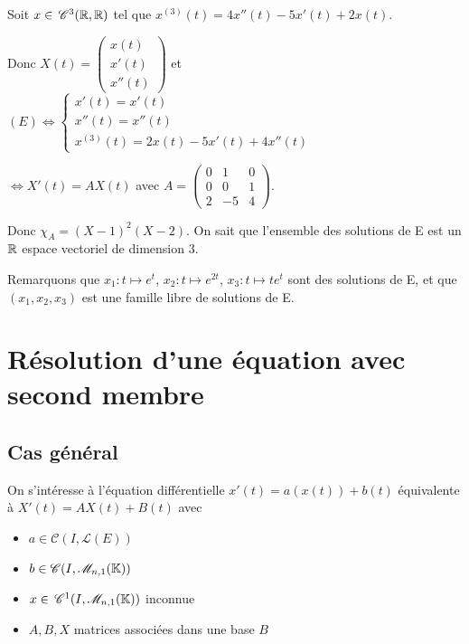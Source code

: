 \begin{exemple}
    Soit $x \in \,\mathscr C^{3} (\mathbb{R}, \mathbb{R})$ tel que $x^{(3)}(t) = 4x''(t) - 5x'(t) + 2x(t)$.

    Donc $X(t) = \begin{pmatrix}
    x(t) \\ x'(t) \\ x''(t)
    \end{pmatrix}$ et 
    $(E) \Leftrightarrow \begin{cases}
    x'(t) = x'(t) \\
    x''(t) = x''(t) \\
    x^{(3)}(t) = 2x(t) - 5x'(t) + 4x''(t)
    \end{cases}$

    $\Leftrightarrow X'(t) = AX(t)$ avec $A = \begin{pmatrix}
    0 & 1 & 0 \\
    0 & 0 & 1 \\
    2 & -5 & 4
    \end{pmatrix}$.

    Donc $\chi_A = (X - 1)^2 (X - 2)$. On sait que l'ensemble des solutions de E est un $\mathbb{R}$
    espace vectoriel de dimension 3. 

    Remarquons que $x_1 : t \mapsto e^t$, $x_2 : t \mapsto e^{2t}$, $x_3 : t \mapsto t e^t$ sont des solutions de E, 
    et que $(x_1, x_2, x_3)$ est une famille libre de solutions de E.  
\end{exemple}

\section{Résolution d'une équation avec second membre}
\subsection{Cas général}

On s'intéresse à l'équation différentielle 
$x'(t) = a(x(t)) + b(t)$ équivalente à $X'(t) = A X(t) + B(t)$ 
avec 
\begin{itemize}
    \item $a \in \mathscr C (I, \mathscr L(E))$
    \item $b \in \mathscr C (I, \mathscr M_{n, 1}(\mathbb{K}))$
    \item $x \in \,\mathscr C^{1} (I, \mathscr M_{n, 1}(\mathbb{K}))$ inconnue
    \item $A, B, X$ matrices associées dans une base $B$
\end{itemize}

